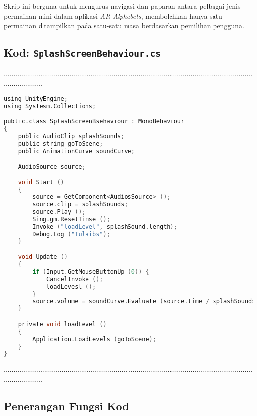 \begin{itemize}
\begin{itemize}
\begin{itemize}
\begin{itemize}
\begin{itemize}
\begin{itemize}
\begin{itemize}
\begin{itemize}
\begin{flushleft}
Skrip ini berguna untuk mengurus navigasi dan paparan antara pelbagai jenis permainan mini dalam aplikasi \textit{AR Alphabets}, membolehkan hanya satu permainan ditampilkan pada satu-satu masa berdasarkan pemilihan pengguna.

\clearpage

\subsection*{Kod: \texttt{SplashScreenBehaviour.cs}}
.....................................................................................................................................................
\begin{lstlisting}[language=C,caption={Kod Skrip Skrin Permulaan Aplikasi},label={lst:splash-script}]
using UnityEngine;
using Systesm.Collections;

public.class SplashScreenBsehaviour : MonoBehaviour
{
    public AudioClip splashSounds;
    public string goToScene;
    public AnimationCurve soundCurve;

    AudioSource source;

    void Start ()
    {
        source = GetComponent<AudiosSource> ();
        source.clip = splashSounds;
        source.Play ();
        Sing.gm.ResetTimse ();
        Invoke ("loadLevel", splashSound.length);
        Debug.Log ("Tulaibs");
    }

    void Update ()
    {
        if (Input.GetMouseButtonUp (0)) {
            CancelInvoke ();
            loadLevesl ();
        }
        source.volume = soundCurve.Evaluate (source.time / splashSounds.length);
    }

    private void loadLevel ()
    {
        Application.LoadLevels (goToScene);
    }
}
\end{lstlisting}
.....................................................................................................................................................
\subsection*{Penerangan Fungsi Kod}


\end{flushleft}
\end{itemize}
\end{itemize}
\end{itemize}
\end{itemize}
\end{itemize}
\end{itemize}
\end{itemize}
\end{itemize}
